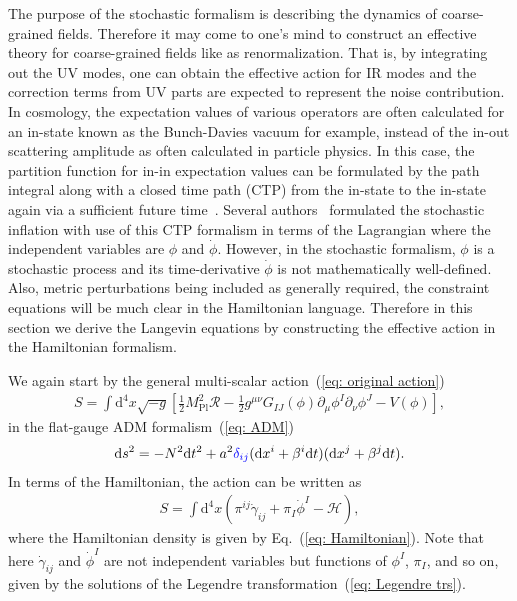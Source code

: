 \documentclass[a4paper,11pt]{article}
\newcommand{\dd}{\mathrm{d}}
\newcommand{\Mpl}{M_\text{Pl}}
\newcommand{\scrH}{\mathscr{H}}
\newcommand{\calR}{\mathcal{R}}
\newcommand{\bae}[1]{\begin{align} #1 \end{align}}
\newcommand{\mathblue}[1]{\textcolor{blue}{#1}}
\begin{document}
The purpose of the stochastic formalism is describing the dynamics of coarse-grained fields. 
Therefore it may come to one's mind to construct an effective theory for coarse-grained fields like as renormalization.
That is, by integrating out the UV modes, one can obtain the effective action for IR modes and the correction terms from UV parts 
are expected to represent the noise contribution. In cosmology, the expectation values of various operators are often calculated for 
an in-state known as the Bunch-Davies vacuum for example, instead of the in-out scattering amplitude as often calculated in particle physics.
In this case, the partition function for in-in expectation values can be formulated by the path integral along with a closed time path (CTP) from the in-state
to the in-state again via a sufficient future time~\cite{Schwinger:1960qe,Feynman:1963fq}.
Several authors~\cite{Morikawa:1989xz,Matarrese:2003ye,Levasseur:2013ffa,Moss:2016uix} formulated the stochastic inflation 
with use of this CTP formalism in terms of the Lagrangian where the independent variables are $\phi$ and $\dot{\phi}$.
However, in the stochastic formalism, $\phi$ is a stochastic process and its time-derivative $\dot{\phi}$ is not mathematically well-defined.
Also, metric perturbations being included as generally required, the constraint equations will be much clear in the Hamiltonian language.
Therefore in this section we derive the Langevin equations by constructing the effective action in the Hamiltonian formalism.


We again start by the general multi-scalar action~(\ref{eq: original action}) 
\bae{
	S=\int\dd^4x\sqrt{-g}\left[\frac{1}{2}\Mpl^2\calR-\frac{1}{2}g^{\mu\nu}G_{IJ}(\phi)\partial_\mu\phi^I\partial_\nu\phi^J-V(\phi)\right],
}
in the flat-gauge ADM formalism~(\ref{eq: ADM})
\bae{
	\dd s^2=-N^2\dd t^2+a^2\mathblue{\delta_{ij}}(\dd x^i+\beta^i\dd t)(\dd x^j+\beta^j\dd t).
}
In terms of the Hamiltonian, the action can be written as
\bae{
	S=\int\dd^4x(\pi^{ij}\dot{\gamma}_{ij}+\pi_I\dot{\phi}^I-\scrH),
}
where the Hamiltonian density is given by Eq.~(\ref{eq: Hamiltonian}).
Note that here $\dot{\gamma}_{ij}$ and $\dot{\phi}^I$ are not independent variables but functions of $\phi^I$, $\pi_I$, and so on,
given by the solutions of the Legendre transformation~(\ref{eq: Legendre trs}).
\end{document}
